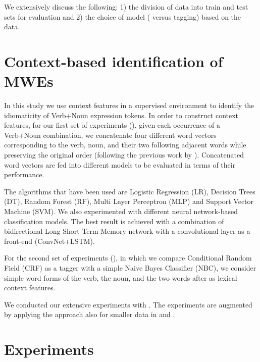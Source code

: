 \documentclass[output=paper
,modfonts
,nonflat]{langsci/langscibook}
\begin{document}
We extensively discuss the following: 1) the division of data into train and test sets for evaluation and 2) the choice of model ( versus tagging) based on the data.

\section{Context-based identification of MWEs}

In this study we use context features in a supervised environment to identify the idiomaticity of Verb+Noun expression tokens. %
In order to construct context features, for our first set of experiments (), given each occurrence of a Verb+Noun combination, we concatenate four different word vectors corresponding to the verb, noun, and their two following adjacent words while preserving the original order (following the previous work by \citealt{taslimipoor2017}). Concatenated word vectors are fed into different  models to be evaluated in terms of their performance.

The  algorithms that have been used are Logistic Regression (LR), Decision Trees (DT), Random Forest (RF), Multi Layer Perceptron (MLP) and Support Vector Machine (SVM). 
We also experimented with different neural network-based classification models. The best result is achieved with a combination of bidirectional Long Short-Term Memory network with a convolutional layer as a front-end (ConvNet+LSTM).  

For the second set of experiments (), in which we compare Conditional Random Field (CRF) as a tagger with a simple Naive Bayes Classifier (NBC), we consider simple word forms of the verb, the noun, and the two words after as lexical context features.

We conducted our extensive experiments with . The experiments are augmented by applying the approach also for smaller data in  and .

\section{Experiments}
\end{document}
